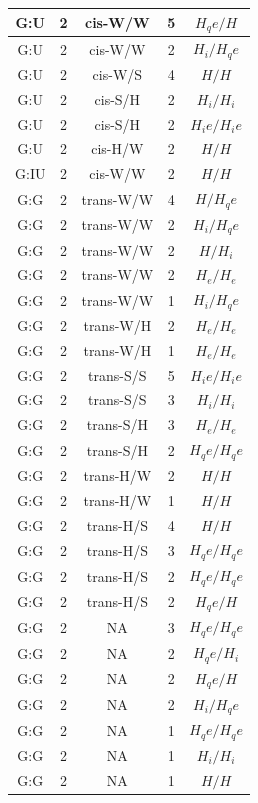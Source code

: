 \begin{center}
\begin{longtable}{c|c|c|c|c}
G:U & 2 & cis-W/W & 5 & $H_qe/H$ \\  \hline
G:U & 2 & cis-W/W & 2 & $H_i/H_qe$ \\  \hline
G:U & 2 & cis-W/S & 4 & $H/H$ \\  \hline
G:U & 2 & cis-S/H & 2 & $H_i/H_i$ \\  \hline
G:U & 2 & cis-S/H & 2 & $H_ie/H_ie$ \\  \hline
G:U & 2 & cis-H/W & 2 & $H/H$ \\  \hline
G:IU & 2 & cis-W/W & 2 & $H/H$ \\  \hline
G:G & 2 & trans-W/W & 4 & $H/H_qe$ \\  \hline
G:G & 2 & trans-W/W & 2 & $H_i/H_qe$ \\  \hline
G:G & 2 & trans-W/W & 2 & $H/H_i$ \\  \hline
G:G & 2 & trans-W/W & 2 & $H_e/H_e$ \\  \hline
G:G & 2 & trans-W/W & 1 & $H_i/H_qe$ \\  \hline
G:G & 2 & trans-W/H & 2 & $H_e/H_e$ \\  \hline
G:G & 2 & trans-W/H & 1 & $H_e/H_e$ \\  \hline
G:G & 2 & trans-S/S & 5 & $H_ie/H_ie$ \\  \hline
G:G & 2 & trans-S/S & 3 & $H_i/H_i$ \\  \hline
G:G & 2 & trans-S/H & 3 & $H_e/H_e$ \\  \hline
G:G & 2 & trans-S/H & 2 & $H_qe/H_qe$ \\  \hline
G:G & 2 & trans-H/W & 2 & $H/H$ \\  \hline
G:G & 2 & trans-H/W & 1 & $H/H$ \\  \hline
G:G & 2 & trans-H/S & 4 & $H/H$ \\  \hline
G:G & 2 & trans-H/S & 3 & $H_qe/H_qe$ \\  \hline
G:G & 2 & trans-H/S & 2 & $H_qe/H_qe$ \\  \hline
G:G & 2 & trans-H/S & 2 & $H_qe/H$ \\  \hline
G:G & 2 & NA & 3 & $H_qe/H_qe$ \\  \hline
G:G & 2 & NA & 2 & $H_qe/H_i$ \\  \hline
G:G & 2 & NA & 2 & $H_qe/H$ \\  \hline
G:G & 2 & NA & 2 & $H_i/H_qe$ \\  \hline
G:G & 2 & NA & 1 & $H_qe/H_qe$ \\  \hline
G:G & 2 & NA & 1 & $H_i/H_i$ \\  \hline
G:G & 2 & NA & 1 & $H/H$ \\  \hline

\end{longtable}
\end{center}
